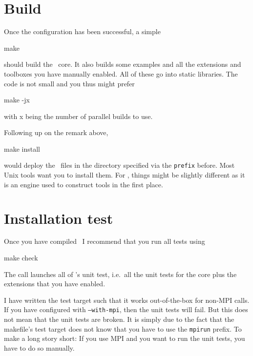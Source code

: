 

\section{Build}

Once the configuration has been successful, a simple 
\begin{code}
make
\end{code}
should build the \Peano\ core.
It also builds some examples and all the extensions and toolboxes you have
manually enabled.
All of these go into static libraries.
The code is not small and you thus might prefer
\begin{code}
make -jx
\end{code}
with x being the number of parallel builds to use.


\begin{remark}
 Following up on the remark above, 
 \begin{code}
make install
 \end{code}
 would deploy the \Peano\ files in the directory specified via the
 \texttt{prefix} before.
 Most Unix tools want you to install them. 
 For \Peano, things might be slightly different as it is an engine used to
 construct tools in the first place. 
\end{remark}





\section{Installation test}

Once you have compiled \Peano\, I recommend that you run all tests using

\begin{code}
  make check
\end{code}

\noindent
The call launches all of \Peano's unit test, i.e.~all the unit tests for the
core plus the extensions that you have enabled.


\begin{remark}
 I have written the test target such that it works out-of-the-box for non-MPI
 calls. If you have configured with \texttt{--with-mpi}, then the unit tests
 will fail. But this does not mean that the unit tests are broken. It is simply
 due to the fact that the makefile's test target does not know that you have to
 use the \texttt{mpirun} prefix.
 To make a long story short: If you use MPI and you want to run the unit tests,
 you have to do so manually.
\end{remark}


